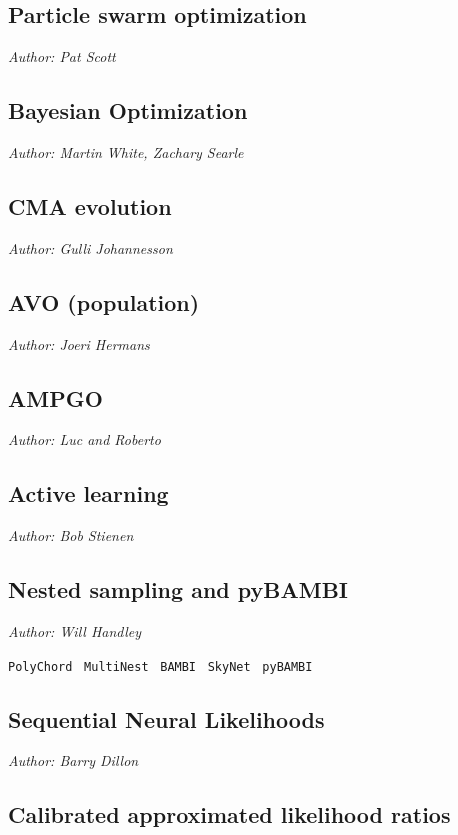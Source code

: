 \documentclass[12pt]{JHEP3}
\begin{document}
\subsection{Particle swarm optimization}
\emph{Author: Pat Scott}

\subsection{Bayesian Optimization}

\emph{Author: Martin White, Zachary Searle}

\subsection{CMA evolution}
\emph{Author: Gulli Johannesson}

\subsection{AVO (population)}
\emph{Author: Joeri Hermans}

\subsection{AMPGO}
\emph{Author: Luc and Roberto} 

\subsection{Active learning}
\emph{Author: Bob Stienen}

\subsection{Nested sampling and pyBAMBI}

\emph{Author: Will Handley}

\texttt{PolyChord}~\cite{2015MNRAS.453.4384H,Handley:2015fda}
\texttt{MultiNest}~\cite{Feroz:2007kg,Feroz:2008xx,Feroz:2013hea}
\texttt{BAMBI}~\cite{Graff:2011gv}
\texttt{SkyNet}~\cite{Graff:2013cla}
\texttt{pyBAMBI}~\cite{pybambi}


\subsection{Sequential Neural Likelihoods}
\emph{Author: Barry Dillon}

\subsection{Calibrated approximated likelihood ratios}
\end{document}

